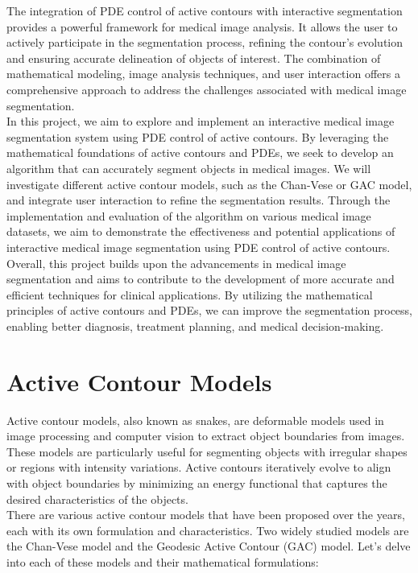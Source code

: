 \documentclass[]{report}
\begin{document}
The integration of PDE control of active contours with interactive segmentation provides a powerful framework for medical image analysis. It allows the user to actively participate in the segmentation process, refining the contour's evolution and ensuring accurate delineation of objects of interest. The combination of mathematical modeling, image analysis techniques, and user interaction offers a comprehensive approach to address the challenges associated with medical image segmentation.\\

In this project, we aim to explore and implement an interactive medical image segmentation system using PDE control of active contours. By leveraging the mathematical foundations of active contours and PDEs, we seek to develop an algorithm that can accurately segment objects in medical images. We will investigate different active contour models, such as the Chan-Vese or GAC model, and integrate user interaction to refine the segmentation results. Through the implementation and evaluation of the algorithm on various medical image datasets, we aim to demonstrate the effectiveness and potential applications of interactive medical image segmentation using PDE control of active contours.\\

Overall, this project builds upon the advancements in medical image segmentation and aims to contribute to the development of more accurate and efficient techniques for clinical applications. By utilizing the mathematical principles of active contours and PDEs, we can improve the segmentation process, enabling better diagnosis, treatment planning, and medical decision-making.\\
\chapter*{Active Contour Models}
Active contour models, also known as snakes, are deformable models used in image processing and computer vision to extract object boundaries from images. These models are particularly useful for segmenting objects with irregular shapes or regions with intensity variations. Active contours iteratively evolve to align with object boundaries by minimizing an energy functional that captures the desired characteristics of the objects.\\

There are various active contour models that have been proposed over the years, each with its own formulation and characteristics. Two widely studied models are the Chan-Vese model and the Geodesic Active Contour (GAC) model. Let's delve into each of these models and their mathematical formulations:\\
\end{document}
